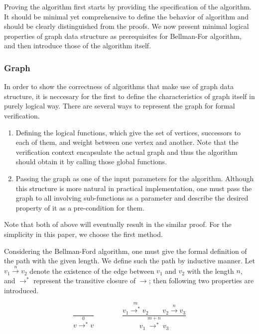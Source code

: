 \documentclass[a4paper,12pt]{article}
\begin{document}
Proving the algorithm first starts by providing the specification of the algorithm. It should be minimal yet comprehensive to define the behavior of algorithm and should be clearly distinguished from the proofs. We now present minimal logical properties of graph data structure as prerequisites for Bellman-For algorithm, and then introduce those of the algorithm itself.

\subsubsection{Graph}

In order to show the correctness of algorithms that make use of graph data structure, it is neccesary for the first to define the characteristics of graph itself in purely logical way. There are several ways to represent the graph for formal verification.

\begin{enumerate}

\item Defining the logical functions, which give the set of vertices, successors to each of them, and weight between one vertex and another. Note that the verification context encapsulate the actual graph and thus the algorithm should obtain it by calling those global functions.

\item Passing the graph as one of the input parameters for the algorithm. Although this structure is more natural in practical implementation, one must pass the graph to all involving sub-functions as a parameter and describe the desired property of it as a pre-condition for them.

\end{enumerate}

Note that both of above will eventually result in the similar proof. For the simplicity in this paper, we choose the first method.

Considering the Bellman-Ford algorithm, one must give the formal definition of the path with the given length. We define such the path by inductive manner. Let $ v_1 \stackrel{n}{\to} v_2 $ denote the existence of the edge between $ v_1 $ and $ v_2 $ with the length $ n $, and $ \to ^* $ represent the transitive closure of $ \to $; then following two properties are introduced.

\begin{displaymath}
  \frac{}
       {v{\stackrel{0}{\to^*}} v}
  \qquad\qquad
  \frac{v_1\stackrel{m}{\to^*}v_2 \qquad v_2\stackrel{n}{\to}v_3}
       {v_1\stackrel{m+n}{\longrightarrow^*}v_3}
\end{displaymath}
\end{document}
